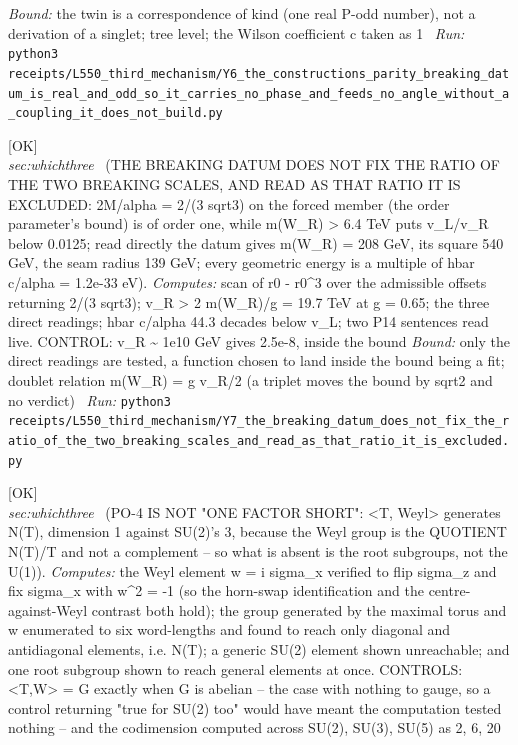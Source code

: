 \begin{description}
 \emph{Bound:} the twin is a correspondence of kind (one real P-odd number), not a derivation of a singlet; tree level; the Wilson coefficient c taken as 1
\ \emph{Run:} \texttt{python3 receipts/L550\_third\_mechanism/Y6\_the\_constructions\_parity\_breaking\_datum\_is\_real\_and\_odd\_so\_it\_carries\_no\_phase\_and\_feeds\_no\_angle\_without\_a\_coupling\_it\_does\_not\_build.py}
\item[\label{rcpt:Y7_the_breaking_datum_does_not_fix_the_ratio_of_the_two_breaking_scales_and_read_as_that_ratio_it_is_excluded}\textbf{}\quad\texttt{Y7\_the\_breaking\_datum\_does\_not\_fix\_the\_ratio\_of\_the\_two\_breaking\_scales\_and\_read\_as\_that\_ratio\_it\_is\_excluded}]\hfill\textsf{[OK]}\\
\textit{sec:whichthree} \ (THE BREAKING DATUM DOES NOT FIX THE RATIO OF THE TWO BREAKING SCALES, AND READ AS THAT RATIO IT IS EXCLUDED: 2M/alpha = 2/(3 sqrt3) on the forced member (the order parameter's bound) is of order one, while m(W\_R) > 6.4 TeV puts v\_L/v\_R below 0.0125; read directly the datum gives m(W\_R) = 208 GeV, its square 540 GeV, the seam radius 139 GeV; every geometric energy is a multiple of hbar c/alpha = 1.2e-33 eV). 
\emph{Computes:} scan of \textbar{}r0 - r0\textasciicircum{}3\textbar{} over the admissible offsets returning 2/(3 sqrt3); v\_R > 2 m(W\_R)/g = 19.7 TeV at g = 0.65; the three direct readings; hbar c/alpha 44.3 decades below v\_L; two P14 sentences read live. CONTROL: v\_R \textasciitilde{} 1e10 GeV gives 2.5e-8, inside the bound
 \emph{Bound:} only the direct readings are tested, a function chosen to land inside the bound being a fit; doublet relation m(W\_R) = g v\_R/2 (a triplet moves the bound by sqrt2 and no verdict)
\ \emph{Run:} \texttt{python3 receipts/L550\_third\_mechanism/Y7\_the\_breaking\_datum\_does\_not\_fix\_the\_ratio\_of\_the\_two\_breaking\_scales\_and\_read\_as\_that\_ratio\_it\_is\_excluded.py}
\item[\label{rcpt:W1_the_weyl_group_is_a_quotient_not_a_complement_so_the_row_is_two_dimensions_short}\textbf{}\quad\texttt{W1\_the\_weyl\_group\_is\_a\_quotient\_not\_a\_complement\_so\_the\_row\_is\_two\_dimensions\_short}]\hfill\textsf{[OK]}\\
\textit{sec:whichthree} \ (PO-4 IS NOT "ONE FACTOR SHORT": <T, Weyl> generates N(T), dimension 1 against SU(2)'s 3, because the Weyl group is the QUOTIENT N(T)/T and not a complement -- so what is absent is the root subgroups, not the U(1)). 
\emph{Computes:} the Weyl element w = i sigma\_x verified to flip sigma\_z and fix sigma\_x with w\textasciicircum{}2 = -1 (so the horn-swap identification and the centre-against-Weyl contrast both hold); the group generated by the maximal torus and w enumerated to six word-lengths and found to reach only diagonal and antidiagonal elements, i.e. N(T); a generic SU(2) element shown unreachable; and one root subgroup shown to reach general elements at once. CONTROLS: <T,W> = G exactly when G is abelian -- the case with nothing to gauge, so a control returning "true for SU(2) too" would have meant the computation tested nothing -- and the codimension computed across SU(2), SU(3), SU(5) as 2, 6, 20

\end{description}
